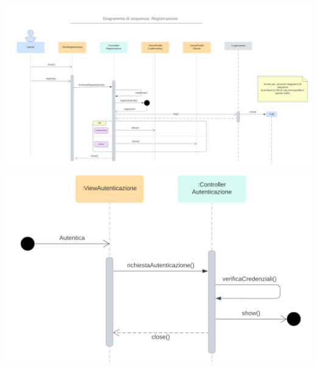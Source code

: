 \includegraphics[width=1\textwidth]{assets/img/sequenza/accesso-1.png}
\includegraphics[width=1\textwidth]{assets/img/sequenza/accesso-2.png}
